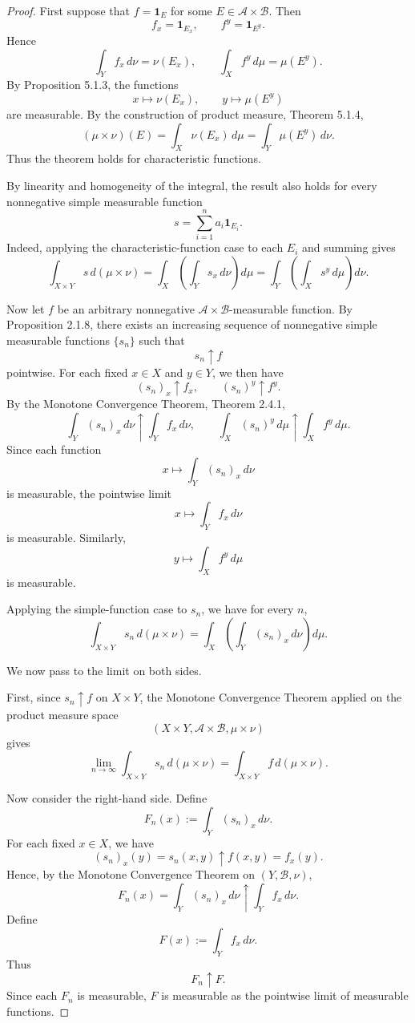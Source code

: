 \documentclass[12pt]{article}
\begin{document}
\begin{proof}
First suppose that $f=\mathbf{1}_E$ for some
$E\in\mathcal{A}\times\mathcal{B}$. Then
\[
f_x=\mathbf{1}_{E_x},
\qquad
f^y=\mathbf{1}_{E^y}.
\]
Hence
\[
\int_Y f_x\,d\nu=\nu(E_x),
\qquad
\int_X f^y\,d\mu=\mu(E^y).
\]
By Proposition 5.1.3, the functions
\[
x\mapsto \nu(E_x),
\qquad
y\mapsto \mu(E^y)
\]
are measurable. By the construction of product measure, Theorem 5.1.4,
\[
(\mu\times\nu)(E)
=
\int_X \nu(E_x)\,d\mu
=
\int_Y \mu(E^y)\,d\nu.
\]
Thus the theorem holds for characteristic functions.

By linearity and homogeneity of the integral, the result also holds for every
nonnegative simple measurable function
\[
s=\sum_{i=1}^n a_i\mathbf{1}_{E_i}.
\]
Indeed, applying the characteristic-function case to each $E_i$ and summing
gives
\[
\int_{X\times Y} s\,d(\mu\times\nu)
=
\int_X\left(\int_Y s_x\,d\nu\right)d\mu
=
\int_Y\left(\int_X s^y\,d\mu\right)d\nu.
\]

Now let $f$ be an arbitrary nonnegative
$\mathcal{A}\times\mathcal{B}$-measurable function. By Proposition 2.1.8,
there exists an increasing sequence of nonnegative simple measurable functions
$\{s_n\}$ such that
\[
s_n \uparrow f
\]
pointwise. For each fixed $x\in X$ and $y\in Y$, we then have
\[
(s_n)_x \uparrow f_x,
\qquad
(s_n)^y \uparrow f^y.
\]
By the Monotone Convergence Theorem, Theorem 2.4.1,
\[
\int_Y (s_n)_x\,d\nu \uparrow \int_Y f_x\,d\nu,
\qquad
\int_X (s_n)^y\,d\mu \uparrow \int_X f^y\,d\mu.
\]
Since each function
\[
x\mapsto \int_Y (s_n)_x\,d\nu
\]
is measurable, the pointwise limit
\[
x\mapsto \int_Y f_x\,d\nu
\]
is measurable. Similarly,
\[
y\mapsto \int_X f^y\,d\mu
\]
is measurable.

Applying the simple-function case to \(s_n\), we have for every \(n\),
\[
\int_{X\times Y} s_n\,d(\mu\times\nu)
=
\int_X\left(\int_Y (s_n)_x\,d\nu\right)d\mu.
\]

We now pass to the limit on both sides.

First, since \(s_n\uparrow f\) on \(X\times Y\), the Monotone Convergence
Theorem applied on the product measure space
\[
(X\times Y,\mathcal A\times\mathcal B,\mu\times\nu)
\]
gives
\[
\lim_{n\to\infty}
\int_{X\times Y} s_n\,d(\mu\times\nu)
=
\int_{X\times Y} f\,d(\mu\times\nu).
\]

Now consider the right-hand side. Define
\[
F_n(x):=\int_Y (s_n)_x\,d\nu.
\]
For each fixed \(x\in X\), we have
\[
(s_n)_x(y)=s_n(x,y)\uparrow f(x,y)=f_x(y).
\]
Hence, by the Monotone Convergence Theorem on \((Y,\mathcal B,\nu)\),
\[
F_n(x)
=
\int_Y (s_n)_x\,d\nu
\uparrow
\int_Y f_x\,d\nu.
\]
Define
\[
F(x):=\int_Y f_x\,d\nu.
\]
Thus
\[
F_n\uparrow F.
\]
Since each \(F_n\) is measurable, \(F\) is measurable as the pointwise limit of
measurable functions.


\end{proof}
\end{document}
